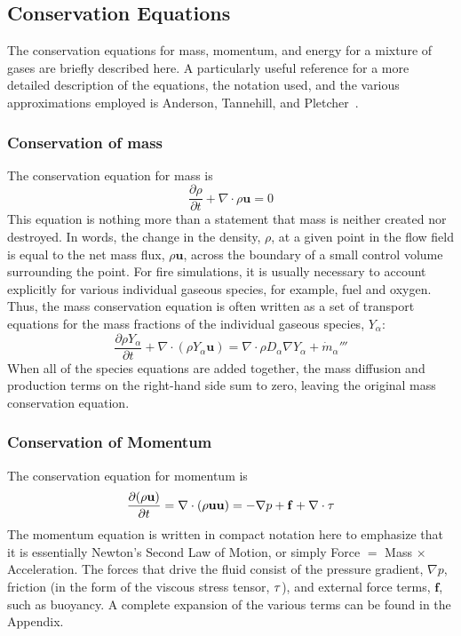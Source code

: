 \documentclass[graybox]{svmult}
\begin{document}
\subsection{Conservation Equations}

The conservation equations for mass, momentum, and energy for a mixture of gases are briefly described here. A particularly useful reference for a more detailed description of the equations, the notation used, and the various approximations employed is Anderson, Tannehill, and Pletcher~\cite{Anderson}.

\subsubsection{Conservation of mass}

The conservation equation for mass is
\begin{equation}
\frac{\partial \rho}{\partial t} + \nabla \cdot \rho \mathbf{u} = 0
\label{eq:masscon}
\end{equation}
This equation is nothing more than a statement that mass is neither created nor destroyed. In words, the change in the density, $\rho$, at a given point in the flow field is equal to the net mass flux, $\rho \mathbf{u}$, across the boundary of a small control volume surrounding the point. For fire simulations, it is usually necessary to account explicitly for various individual gaseous species, for example, fuel and oxygen. Thus, the mass conservation equation is often written as a set of transport equations for the mass fractions of the individual gaseous species, $Y_\alpha$:
\begin{equation}
\frac{\partial \rho Y_\alpha}{\partial t} + \nabla \cdot (\rho Y_\alpha \mathbf{u}) = \nabla \cdot \rho D_\alpha \nabla Y_\alpha + \dot{m}_\alpha'''
\label{eq:speccon}
\end{equation}
When all of the species equations are added together, the mass diffusion and production terms on the right-hand side sum to zero, leaving the original mass conservation equation.

\subsubsection{Conservation of Momentum}

The conservation equation for momentum is
\begin{equation}
\frac{\partial (\rho \mathbf{u})}{\partial t} = \nabla \cdot (\rho \mathbf{u} \mathbf{u}) = -\nabla p + \mathbf{f} + \nabla \cdot \tens{\tau}
\label{eq:momcon}
\end{equation}
The momentum equation is written in compact notation here to emphasize that it is essentially Newton's Second Law of Motion, or simply Force $=$ Mass $\times$ Acceleration. The forces that drive the fluid consist of the pressure gradient, $\nabla p$, friction (in the form of the viscous stress tensor, $\tens{\tau}$), and external force terms, $\mathbf{f}$, such as buoyancy. A complete expansion of the various terms can be found in the Appendix.
\end{document}

